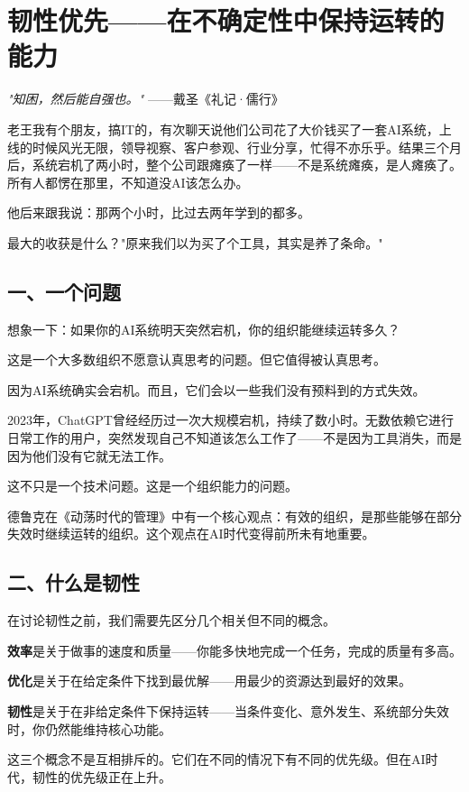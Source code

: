 \chapter{韧性优先——在不确定性中保持运转的能力}


\textit{"知困，然后能自强也。"}
——戴圣《礼记·儒行》


老王我有个朋友，搞IT的，有次聊天说他们公司花了大价钱买了一套AI系统，上线的时候风光无限，领导视察、客户参观、行业分享，忙得不亦乐乎。结果三个月后，系统宕机了两小时，整个公司跟瘫痪了一样——不是系统瘫痪，是人瘫痪了。所有人都愣在那里，不知道没AI该怎么办。

他后来跟我说：那两个小时，比过去两年学到的都多。

最大的收获是什么？"原来我们以为买了个工具，其实是养了条命。"

\section{一、一个问题}


想象一下：如果你的AI系统明天突然宕机，你的组织能继续运转多久？

这是一个大多数组织不愿意认真思考的问题。但它值得被认真思考。

因为AI系统确实会宕机。而且，它们会以一些我们没有预料到的方式失效。

2023年，ChatGPT曾经经历过一次大规模宕机，持续了数小时。无数依赖它进行日常工作的用户，突然发现自己不知道该怎么工作了——不是因为工具消失，而是因为他们没有它就无法工作。

这不只是一个技术问题。这是一个组织能力的问题。

德鲁克在《动荡时代的管理》中有一个核心观点：有效的组织，是那些能够在部分失效时继续运转的组织。这个观点在AI时代变得前所未有地重要。

\section{二、什么是韧性}


在讨论韧性之前，我们需要先区分几个相关但不同的概念。

\textbf{效率}是关于做事的速度和质量——你能多快地完成一个任务，完成的质量有多高。

\textbf{优化}是关于在给定条件下找到最优解——用最少的资源达到最好的效果。

\textbf{韧性}是关于在非给定条件下保持运转——当条件变化、意外发生、系统部分失效时，你仍然能维持核心功能。

这三个概念不是互相排斥的。它们在不同的情况下有不同的优先级。但在AI时代，韧性的优先级正在上升。

